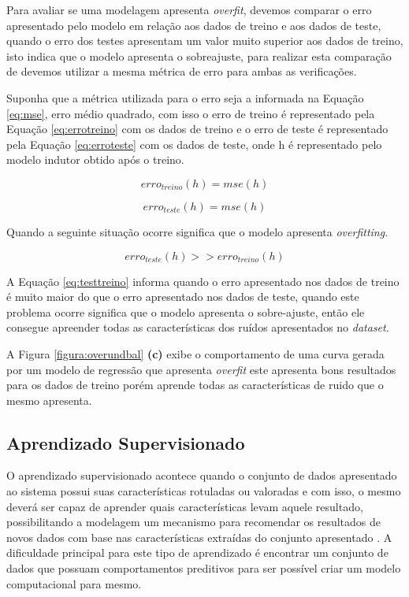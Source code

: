 \documentclass[
12pt,				%
oneside,			%
a4paper,			%
english,			%
french,				%
spanish,			%
brazil				%
]{abntex2}
\begin{document}
Para avaliar se uma modelagem apresenta \textit{overfit}, devemos comparar o erro apresentado pelo modelo em relação aos dados de treino e aos dados de teste, quando o erro dos testes apresentam um valor muito superior aos dados de treino, isto indica que o modelo apresenta o sobreajuste, para realizar esta comparação de devemos utilizar a mesma métrica de erro para ambas as verificações.

Suponha que a métrica utilizada para o erro seja a informada na Equação \ref{eq:mse}, erro médio quadrado, com isso o erro de treino é representado pela Equação \ref{eq:errotreino} com os dados de treino e o erro de teste é representado pela Equação \ref{eq:erroteste} com os dados de teste, onde h é representado pelo modelo indutor obtido após o treino.
		
\begin{equation}
	erro_{treino}(h) = mse(h)
	\label{eq:errotreino}
\end{equation}


\begin{equation}
erro_{teste}(h) = mse(h)
\label{eq:erroteste}
\end{equation}


Quando a seguinte situação ocorre significa que o modelo apresenta \textit{overfitting}. 

\begin{equation}
	erro_{teste}(h) >> erro_{treino}(h)
	\label{eq:testtreino} 
\end{equation}   

A Equação \ref{eq:testtreino} informa quando o erro apresentado nos dados de treino é muito maior do que o erro apresentado nos dados de teste, quando este problema ocorre significa que o modelo apresenta o sobre-ajuste, então ele consegue apreender todas as características dos ruídos apresentados no \textit{dataset}.

A Figura \ref{figura:overundbal}\textbf{ (c)} exibe o comportamento de uma curva gerada por um modelo de regressão que apresenta \textit{overfit} este apresenta bons resultados para os dados de treino porém aprende todas as características de ruido que o mesmo apresenta.





\subsection{Aprendizado Supervisionado}

O aprendizado supervisionado acontece quando o conjunto de dados apresentado ao sistema possui suas características rotuladas ou valoradas e com isso, o mesmo deverá ser capaz de aprender quais características levam aquele resultado, possibilitando a modelagem um mecanismo para recomendar os resultados de novos dados com base nas características extraídas do conjunto apresentado  \cite{ViniciusPonte2015}. A dificuldade principal para este tipo de aprendizado é encontrar um conjunto de dados que possuam comportamentos preditivos para ser possível criar um modelo computacional para mesmo\cite{monard2003conceitos}.
\end{document}
